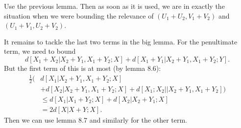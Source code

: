 \documentclass[12pt]{article}
\begin{document}
\begin{proofbox}
	Use the previous lemma. Then as soon as it is used, we are in exactly the situation when we were bounding the relevance of $(U_1 + U_2, V_1 + V_2)$ and $(U_1 + V_1, U_2 + V_2)$.
\end{proofbox}

It remains to tackle the last two terms in the big lemma. For the penultimate term, we need to bound
\[
	d[X_1 + X_2 | X_2 + Y_1 , X_1 + Y_2; X] + d[X_1 + Y_1 | X_2 + Y_1, X_1 + Y_2 ; Y].
\]
But the first term of this is at most (by lemma 8.6):
\begin{align*}
	\frac 12 \biggl( &d[X_1|X_2 + Y_1, X_1 + Y_2; X] \\
	&+ d[X_2|X_2 + Y_1, X_1 + Y_2; X] + d[X_1; X_2 || X_2 + Y_1, X_1 + Y_2] \biggr) \\
	& \leq d[X_1| X_1 + Y_2; X] + d[X_2| X_2 + Y_1; X] \\
	&= 2d[X|X+Y; X].
\end{align*}
Then we can use lemma 8.7 and similarly for the other term.

\newpage

\printindex
\end{document}
